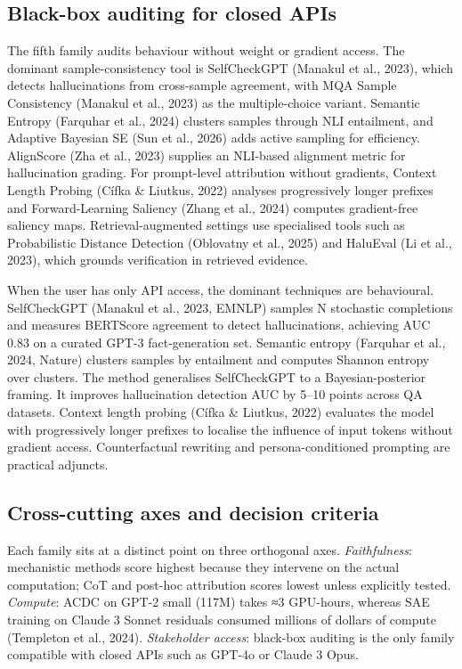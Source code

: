 \subsection{Black-box auditing for closed APIs}\label{black-box-auditing-for-closed-apis}

The fifth family audits behaviour without weight or gradient access. The dominant sample-consistency tool is SelfCheckGPT (Manakul et al., 2023), which detects hallucinations from cross-sample agreement, with MQA Sample Consistency (Manakul et al., 2023) as the multiple-choice variant. Semantic Entropy (Farquhar et al., 2024) clusters samples through NLI entailment, and Adaptive Bayesian SE (Sun et al., 2026) adds active sampling for efficiency. AlignScore (Zha et al., 2023) supplies an NLI-based alignment metric for hallucination grading. For prompt-level attribution without gradients, Context Length Probing (Cífka \& Liutkus, 2022) analyses progressively longer prefixes and Forward-Learning Saliency (Zhang et al., 2024) computes gradient-free saliency maps. Retrieval-augmented settings use specialised tools such as Probabilistic Distance Detection (Oblovatny et al., 2025) and HaluEval (Li et al., 2023), which grounds verification in retrieved evidence.

When the user has only API access, the dominant techniques are behavioural. SelfCheckGPT (Manakul et al., 2023, EMNLP) samples N stochastic completions and measures BERTScore agreement to detect hallucinations, achieving AUC 0.83 on a curated GPT-3 fact-generation set. Semantic entropy (Farquhar et al., 2024, Nature) clusters samples by entailment and computes Shannon entropy over clusters. The method generalises SelfCheckGPT to a Bayesian-posterior framing. It improves hallucination detection AUC by 5--10 points across QA datasets. Context length probing (Cífka \& Liutkus, 2022) evaluates the model with progressively longer prefixes to localise the influence of input tokens without gradient access. Counterfactual rewriting and persona-conditioned prompting are practical adjuncts.

\subsection{Cross-cutting axes and decision criteria}\label{cross-cutting-axes-and-decision-criteria}

Each family sits at a distinct point on three orthogonal axes. \emph{Faithfulness}: mechanistic methods score highest because they intervene on the actual computation; CoT and post-hoc attribution scores lowest unless explicitly tested. \emph{Compute}: ACDC on GPT-2 small (117M) takes ≈3 GPU-hours, whereas SAE training on Claude 3 Sonnet residuals consumed millions of dollars of compute (Templeton et al., 2024). \emph{Stakeholder access}: black-box auditing is the only family compatible with closed APIs such as GPT-4o or Claude 3 Opus.

